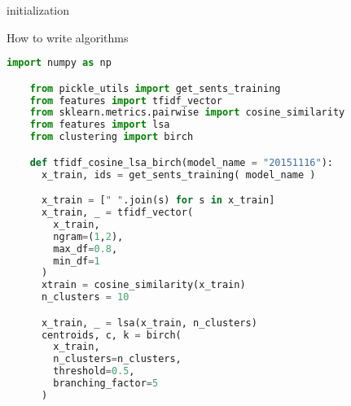 \begin{algorithm}[H]
 initialization\;
 \caption{How to write algorithms}
\end{algorithm}


   \begin{lstlisting}[language=Python]
    import numpy as np

    from pickle_utils import get_sents_training
    from features import tfidf_vector
    from sklearn.metrics.pairwise import cosine_similarity
    from features import lsa
    from clustering import birch

    def tfidf_cosine_lsa_birch(model_name = "20151116"):
      x_train, ids = get_sents_training( model_name )

      x_train = [" ".join(s) for s in x_train]
      x_train, _ = tfidf_vector( 
        x_train, 
        ngram=(1,2),
        max_df=0.8, 
        min_df=1
      )
      xtrain = cosine_similarity(x_train)
      n_clusters = 10

      x_train, _ = lsa(x_train, n_clusters)
      centroids, c, k = birch(
        x_train, 
        n_clusters=n_clusters, 
        threshold=0.5, 
        branching_factor=5
      )
  \end{lstlisting}